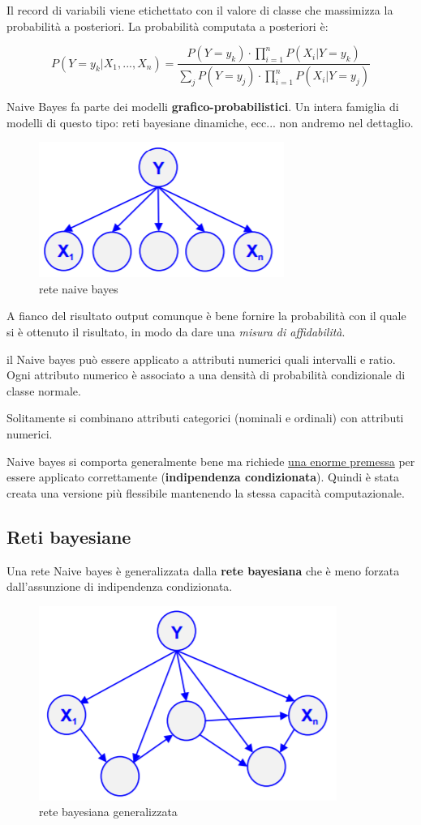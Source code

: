 Il record di variabili viene etichettato con il valore di classe che massimizza la probabilit\`a a posteriori.
La probabilit\`a computata a posteriori \`e:

\[P(Y=y_k|X_1,...,X_n) = \frac{P(Y=y_k)\cdot \prod_{i=1}^{n}P(X_i|Y=y_k)}{\sum_{j}P(Y=y_j) \cdot \prod_{i=1}^{n}P(X_i|Y=y_j)} \]

Naive Bayes fa parte dei modelli \textbf{grafico-probabilistici}. Un intera famiglia di modelli di questo tipo: reti bayesiane dinamiche, ecc... non andremo nel dettaglio.

\begin{figure}[h!]
	\centering
	\includegraphics[height=0.3 \linewidth]{pict/naivebayes.png}
	\caption{rete naive bayes}
\end{figure}

A fianco del risultato output comunque \`e bene fornire la probabilit\`a con il quale si \`e ottenuto il risultato, in modo da dare una \textit{misura di affidabilit\`a}. 

il Naive bayes pu\`o essere applicato a attributi numerici quali intervalli e ratio. Ogni attributo numerico è associato a una densit\`a di probabilit\`a condizionale di classe normale. 

Solitamente si combinano attributi categorici (nominali e ordinali) con attributi numerici. 

Naive bayes si comporta generalmente bene ma richiede \underline{una enorme premessa} per essere applicato correttamente (\textbf{indipendenza condizionata}). Quindi \`e stata creata una versione pi\`u flessibile mantenendo la stessa capacit\`a computazionale.

\subsection{Reti bayesiane}
Una rete Naive bayes \`e generalizzata dalla \textbf{rete bayesiana} che \`e meno forzata dall'assunzione di indipendenza condizionata. 

\begin{figure}[h!]
	\centering
	\includegraphics[height=0.35 \linewidth]{pict/networkbayes.png}
	\caption{rete bayesiana generalizzata}
\end{figure}

